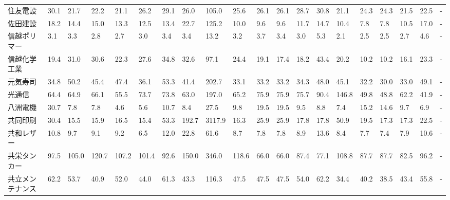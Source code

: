 \begin{tabular}{llllllllllllllllllll}
住友電設            &   30.1 &   21.7 &      22.2 &      21.1 &       26.2 &    29.1 &    26.0 &    105.0 &    25.6 &    26.1 &   26.1 &   28.7 &    30.8 &    21.1 &    24.3 &   24.3 &   21.5 &    22.5 &      - \\
佐田建設            &   18.2 &   14.4 &      15.0 &      13.3 &       12.5 &    13.4 &    22.7 &    125.2 &    10.0 &     9.6 &    9.6 &   11.7 &    14.7 &    10.4 &     7.8 &    7.8 &   10.5 &    17.0 &      - \\
信越ポリマー          &    3.1 &    3.3 &       2.8 &       2.7 &        3.0 &     3.4 &     3.4 &     13.2 &     3.2 &     3.7 &    3.4 &    3.0 &     5.3 &     2.1 &     2.5 &    2.5 &    2.7 &     4.6 &      - \\
信越化学工業          &   19.4 &   31.0 &      30.6 &      22.3 &       27.6 &    34.8 &    32.6 &     97.1 &    24.4 &    19.1 &   17.4 &   18.2 &    43.4 &    20.2 &    10.2 &   10.2 &   16.1 &    23.3 &      - \\
元気寿司            &   34.8 &   50.2 &      45.4 &      47.4 &       36.1 &    53.3 &    41.4 &    202.7 &    33.1 &    33.2 &   33.2 &   34.3 &    48.0 &    45.1 &    32.2 &   30.0 &   33.0 &    49.1 &      - \\
光通信             &   64.4 &   64.9 &      66.1 &      55.5 &       73.7 &    73.8 &    63.0 &    197.0 &    65.2 &    75.9 &   75.9 &   75.7 &    90.4 &   146.8 &    49.8 &   48.8 &   62.2 &    41.9 &      - \\
八洲電機            &   30.7 &    7.8 &       7.8 &       4.6 &        5.6 &    10.7 &     8.4 &     27.5 &     9.8 &    19.5 &   19.5 &    9.5 &     8.8 &     7.4 &    15.2 &   14.6 &    9.7 &     6.9 &      - \\
共同印刷            &   30.4 &   15.5 &      15.9 &      16.5 &       15.4 &    53.3 &   192.7 &   3117.9 &    16.3 &    25.9 &   25.9 &   17.8 &    17.8 &    50.9 &    19.5 &   17.3 &   17.3 &    22.5 &      - \\
共和レザー           &   10.8 &    9.7 &       9.1 &       9.2 &        6.5 &    12.0 &    22.8 &     61.6 &     8.7 &     7.8 &    7.8 &    8.9 &    13.6 &     8.4 &     7.7 &    7.4 &    7.9 &    10.6 &      - \\
共栄タンカー          &   97.5 &  105.0 &     120.7 &     107.2 &      101.4 &    92.6 &   150.0 &    346.0 &   118.6 &    66.0 &   66.0 &   87.4 &    77.1 &   108.8 &    87.7 &   87.7 &   82.5 &    96.2 &      - \\
共立メンテナンス        &   62.2 &   53.7 &      40.9 &      52.0 &       44.0 &    61.3 &    43.3 &    116.3 &    47.5 &    47.5 &   47.5 &   54.0 &    62.2 &    34.4 &    40.2 &   38.5 &   43.4 &    55.8 &      - \\

\end{tabular}
